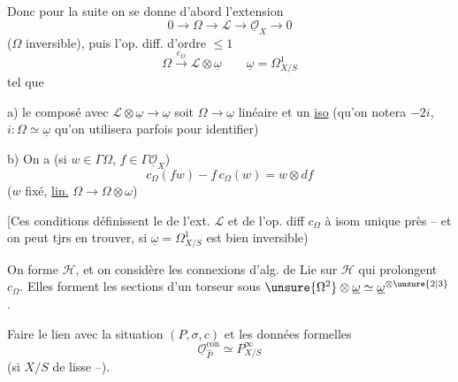 Donc pour la suite on se donne d'abord l'extension
\[
0\longrightarrow\Omega\longrightarrow\mathcal{L}\longrightarrow\underline{\mathcal{O}}_X\longrightarrow0
\]
($\Omega$ inversible), puis l'op. diff. d'ordre $\leq1$
\[
\Omega\xrightarrow{c_\Omega}\mathcal{L}\otimes\underline{\omega}\qquad\underline{\omega}=\Omega^1_{X/S}
\]
tel que

a) le composé avec $\mathcal{L}\otimes\underline{\omega}\longrightarrow\underline{\omega}$ soit  $\Omega\longrightarrow\underline{\omega}$ linéaire et un \uline{iso} (qu'on notera $-2i$, $i:\Omega\simeq\underline{\omega}$ qu'on utilisera parfois pour identifier)

b)  On a (si $w\in\Gamma\Omega$, $f\in\Gamma\underline{\mathcal{O}}_X$)
\[
c_\Omega(fw)-f\,c_\Omega(w)=w\otimes df
\]
($w$ fixé,  \uline{lin.} $\Omega\longrightarrow\Omega\otimes\omega$)

[Ces conditions définissent le  de l'ext. $\mathcal{L}$ et de l'op. diff $c_\Omega$ à isom unique près -- et on peut tjrs en trouver, si $\underline{\omega}=\Omega^1_{X/S}$ est bien inversible)

On forme $\mathcal{H}$, et on considère les connexions  d'alg. de Lie  sur $\mathcal{H}$ qui prolongent $c_\Omega$. Elles forment les sections d'un torseur sous $\unsure{\Omega^2}\otimes\underline{\omega}\simeq\underline{\omega}^{\otimes\unsure{2|3}}$. 


Faire le lien avec la situation $(P,\sigma,c)$ et les données formelles
\[
\underline{\mathcal{O}}_{\widehat P}^{\mathrm{con}}\simeq P^\infty_{X/S}
\]
(si $X/S$ de  lisse --).
